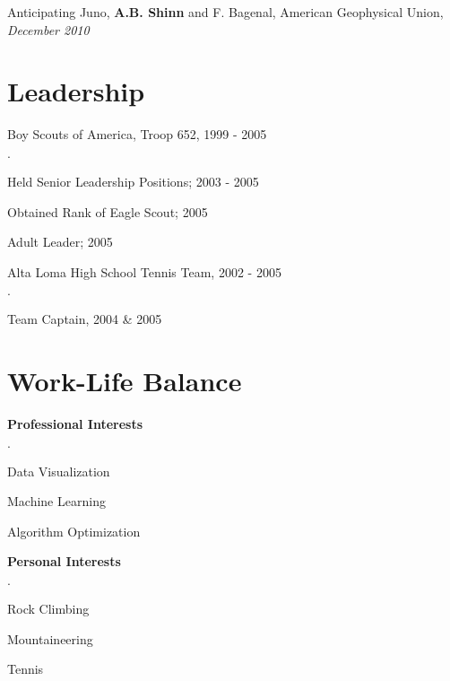 \documentclass[margin,line]{res}
\newenvironment{list2}{
  \begin{list}{$\cdot$}{%
      \setlength{\itemsep}{0in}
      \setlength{\parsep}{0in} \setlength{\parskip}{0in}
      \setlength{\topsep}{0in} \setlength{\partopsep}{0in} 
      \setlength{\leftmargin}{0.2in}}}{\end{list}}
\begin{document}
\begin{resume}
Anticipating Juno, {\bf A.B. Shinn} and F. Bagenal, American Geophysical Union, {\it December 2010}


\section{\sc Leadership}

Boy Scouts of America, Troop 652, 1999 - 2005
\begin{list2}
\item Held Senior Leadership Positions; 2003 - 2005
\item Obtained Rank of Eagle Scout; 2005
\item Adult Leader; 2005
\end{list2}

\vspace*{-2.5mm}
Alta Loma High School Tennis Team, 2002 - 2005
\begin{list2}
\item Team Captain, 2004 \& 2005
\end{list2}


\section{\sc Work-Life Balance}

{\bf Professional Interests}
\begin{list2}
\item Data Visualization
\item Machine Learning
\item Algorithm Optimization
\end{list2}

\vspace*{-2.5mm}

{\bf Personal Interests}
\begin{list2}
\item Rock Climbing
\item Mountaineering
\item Tennis
\end{list2}


\end{resume}
\end{document}
